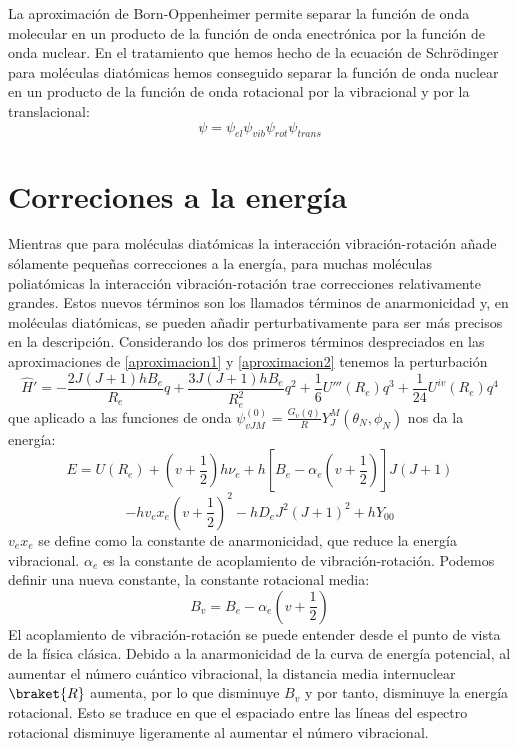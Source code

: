 \documentclass[a4paper]{article}
\begin{document}
La aproximación de Born-Oppenheimer permite separar la función de onda molecular en un producto de la función de onda enectrónica por la función de onda nuclear. En el tratamiento que hemos hecho de la ecuación de Schrödinger para moléculas diatómicas hemos conseguido separar la función de onda nuclear en un producto de la función de onda rotacional por la vibracional y por la translacional:
\begin{equation}
\psi=\psi_{el}\psi_{vib}\psi_{rot}\psi_{trans}
\end{equation}

\section{Correciones a la energía}
Mientras que para moléculas diatómicas la interacción vibración-rotación añade sólamente pequeñas correcciones a la energía, para muchas moléculas poliatómicas la interacción vibración-rotación trae correcciones relativamente grandes. Estos nuevos términos son los llamados términos de anarmonicidad y, en moléculas diatómicas, se pueden añadir perturbativamente para ser más precisos en la descripción. Considerando los dos primeros términos despreciados en las aproximaciones de {\ref{aproximacion1} y \ref{aproximacion2} tenemos la perturbación
\begin{equation}
\hat H'=-\frac{2J(J+1)hB_e}{R_e}q +\frac{3J(J+1)hB_e}{R^2_e}q^2+\frac{1}{6}U'''(R_e)q^3+\frac{1}{24}U^{iv}(R_e)q^4
\end{equation}
que aplicado a las funciones de onda $\psi_{vJM}^{(0)}=\frac{G_v(q)}{R}Y_J^M(\theta_N,\phi_N)$ nos da la energía:
$$
E=U(R_e)+\left(v+\frac{1}{2}\right)h\nu_e+h\left[B_e-\alpha_e\left(v+\frac{1}{2}\right)\right]J(J+1)
$$
\begin{equation}
-hv_ex_e\left(v+\frac{1}{2}\right)^2-hD_eJ^2(J+1)^2 +hY_{00}
\end{equation}
$v_ex_e$ se define como la constante de anarmonicidad, que reduce la energía vibracional. $\alpha_e$ es la constante de acoplamiento de vibración-rotación. Podemos definir una nueva constante, la constante rotacional media: 
\begin{equation}
B_v=B_e-\alpha_e\left(v+\frac{1}{2}\right)
\end{equation} 
El acoplamiento de vibración-rotación se puede entender desde el punto de vista de la física clásica. Debido a la anarmonicidad de la curva de energía potencial, al aumentar el número cuántico vibracional, la distancia media internuclear $\braket{R}$ aumenta, por lo que disminuye $B_v$ y por tanto, disminuye la energía rotacional. Esto se traduce en que el espaciado entre las líneas del espectro rotacional disminuye ligeramente al aumentar el número vibracional.\\

}
\end{document}
